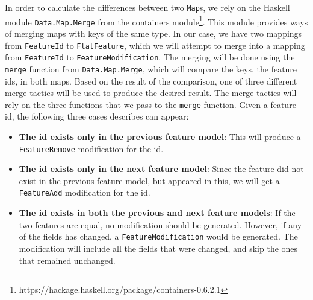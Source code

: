 \documentclass[a4paper,english]{ifimaster}
\begin{document}
In order to calculate the differences between two \texttt{Map}s, we rely on the Haskell module \texttt{Data.Map.Merge} from the containers module\footnote{https://hackage.haskell.org/package/containers-0.6.2.1}. This module provides ways of merging maps with keys of the same type. In our case, we have two mappings from \texttt{FeatureId} to \texttt{FlatFeature}, which we will attempt to merge into a mapping from \texttt{FeatureId} to \texttt{FeatureModification}. The merging will be done using the \texttt{merge} function from \texttt{Data.Map.Merge}, which will compare the keys, the feature ids, in both maps. Based on the result of the comparison, one of three different merge tactics will be used to produce the desired result. The merge tactics will rely on the three functions that we pass to the \texttt{merge} function. Given a feature id, the following three cases describes can appear:

\begin{itemize}
  \item \textbf{The id exists only in the previous feature model}: This will produce a \texttt{FeatureRemove} modification for the id.
  \item \textbf{The id exists only in the next feature model}: Since the feature did not exist in the previous feature model, but appeared in this, we will get a \texttt{FeatureAdd} modification for the id.
  \item \textbf{The id exists in both the previous and next feature models}: If the two features are equal, no modification should be generated. However, if any of the fields has changed, a \texttt{FeatureModification} would be generated. The modification will include all the fields that were changed, and skip the ones that remained unchanged.
\end{itemize}
\end{document}
